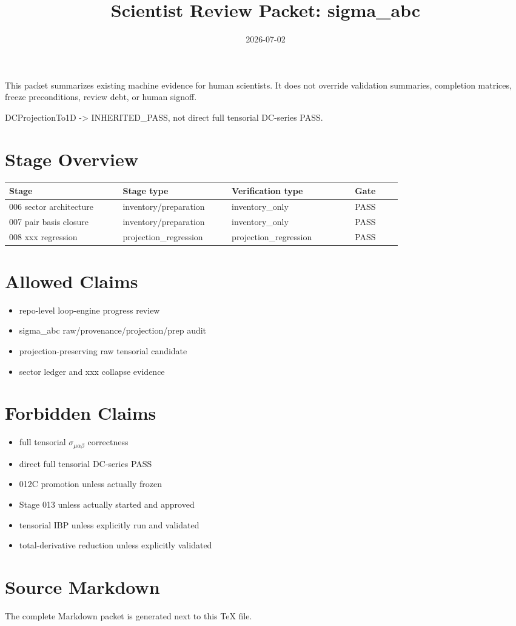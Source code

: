 \documentclass[11pt]{ctexart}
\title{Scientist Review Packet: sigma\_abc}
\date{2026-07-02}
\begin{document}
\maketitle

\begin{tcolorbox}[title=Purpose]
This packet summarizes existing machine evidence for human scientists. It does
not override validation summaries, completion matrices, freeze preconditions,
review debt, or human signoff.
\end{tcolorbox}

\begin{tcolorbox}[title=Permanent Caveat]
DCProjectionTo1D -> INHERITED\_PASS, not direct full tensorial DC-series PASS.
\end{tcolorbox}

\section*{Stage Overview}
\small
\begin{longtable}{p{0.24\linewidth}p{0.23\linewidth}p{0.26\linewidth}p{0.10\linewidth}}
\toprule
Stage & Stage type & Verification type & Gate \\
\midrule
006 sector architecture & inventory/preparation & inventory\_only & PASS \\
007 pair basis closure & inventory/preparation & inventory\_only & PASS \\
008 xxx regression & projection\_regression & projection\_regression & PASS \\
\bottomrule
\end{longtable}
\normalsize

\section*{Allowed Claims}
\begin{itemize}
\item repo-level loop-engine progress review
\item sigma\_abc raw/provenance/projection/prep audit
\item projection-preserving raw tensorial candidate
\item sector ledger and xxx collapse evidence
\end{itemize}

\section*{Forbidden Claims}
\begin{itemize}
\item full tensorial $\sigma_{\mu\alpha\beta}$ correctness
\item direct full tensorial DC-series PASS
\item 012C promotion unless actually frozen
\item Stage 013 unless actually started and approved
\item tensorial IBP unless explicitly run and validated
\item total-derivative reduction unless explicitly validated
\end{itemize}

\section*{Source Markdown}
The complete Markdown packet is generated next to this TeX file.
\end{document}
